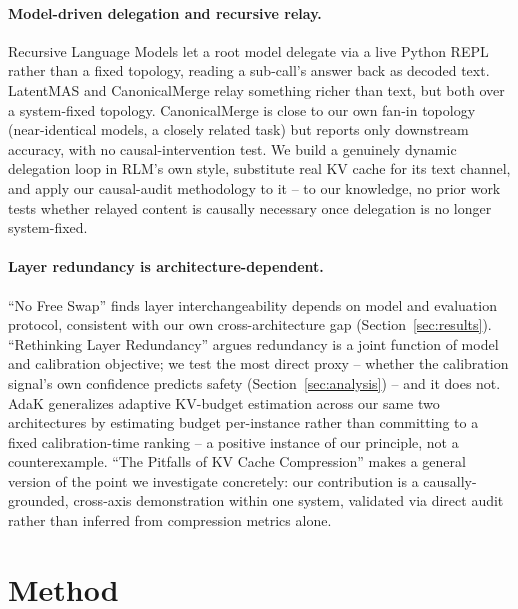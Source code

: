 \documentclass[11pt]{article}
\begin{document}
\paragraph{Model-driven delegation and recursive relay.} Recursive
Language Models \citep{rlm2026} let a root model delegate via a live
Python REPL rather than a fixed topology, reading a sub-call's answer
back as decoded text. LatentMAS and CanonicalMerge
\citep{canonicalmerge2026} relay something richer than text, but both
over a system-fixed topology. CanonicalMerge is close to our own fan-in
topology (near-identical models, a closely related task) but reports only
downstream accuracy, with no causal-intervention test. We build a
genuinely dynamic delegation loop in RLM's own style, substitute real KV
cache for its text channel, and apply our causal-audit methodology to
it -- to our knowledge, no prior work tests whether relayed content is
causally necessary once delegation is no longer system-fixed.

\paragraph{Layer redundancy is architecture-dependent.} ``No Free Swap''
\citep{nofreeswap2026} finds layer interchangeability depends on model
and evaluation protocol, consistent with our own cross-architecture gap
(Section~\ref{sec:results}). ``Rethinking Layer Redundancy''
\citep{rethinkredundancy2026} argues redundancy is a joint function of
model and calibration objective; we test the most direct proxy -- whether
the calibration signal's own confidence predicts safety
(Section~\ref{sec:analysis}) -- and it does not. AdaK \citep{adak2026}
generalizes adaptive KV-budget estimation across our same two
architectures by estimating budget per-instance rather than committing to
a fixed calibration-time ranking -- a positive instance of our principle,
not a counterexample. ``The Pitfalls of KV Cache Compression''
\citep{pitfallskv2026} makes a general version of the point we
investigate concretely: our contribution is a causally-grounded,
cross-axis demonstration within one system, validated via direct audit
rather than inferred from compression metrics alone.

\section{Method}
\label{sec:method}
\end{document}
